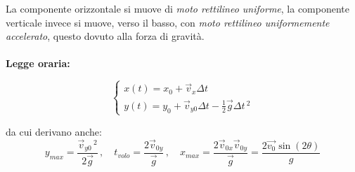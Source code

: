 La componente orizzontale si muove di \textit{moto rettilineo uniforme}, la componente verticale invece si muove, verso il basso, con \textit{moto rettilineo uniformemente accelerato}, questo dovuto alla forza di gravità.

\paragraph{}
\textbf{Legge oraria:}

$$
\begin{cases}

     x(t) = x_0 + \vec{v}_x\Delta t\\
     y(t) = y_0 + \vec{v}_{y0}\Delta t-\frac{1}{2}\vec{g}\Delta t\,^2
     
\end{cases}
$$

da cui derivano anche:
\begin{equation*}
    y_{max} = \frac{\vec{v}_{y0}\,^2}{2\vec{g}}\,, \quad t_{volo} = \frac{2\vec{v}_{0y}}{\vec{g}}\,, \quad x_{max} = \frac{2\vec{v}_{0x}\vec{v}_{0y}}{\vec{g}} = \frac{2\vec{v_0}\sin(2\theta)}{g}
\end{equation*}


